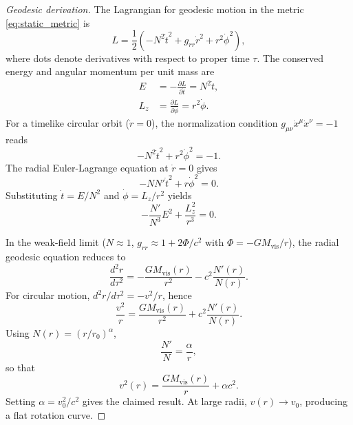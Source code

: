 \documentclass[11pt,a4paper]{article}
\theoremstyle{definition}
\newcommand{\vis}{\mathrm{vis}}
\begin{document}
\begin{proof}[Geodesic derivation]
The Lagrangian for geodesic motion in the metric \eqref{eq:static_metric} is
\begin{equation}
    L = \frac{1}{2}\left(-N^2\dot{t}^2 + g_{rr}\dot{r}^2 + r^2\dot{\phi}^2\right),
\end{equation}
where dots denote derivatives with respect to proper time $\tau$. The conserved energy and angular momentum per unit mass are
\begin{align}
    E &= -\frac{\partial L}{\partial \dot{t}} = N^2\dot{t}, \\
    L_z &= \frac{\partial L}{\partial \dot{\phi}} = r^2\dot{\phi}.
\end{align}
For a timelike circular orbit ($\dot{r}=0$), the normalization condition $g_{\mu\nu}\dot{x}^\mu\dot{x}^\nu=-1$ reads
\begin{equation}
    -N^2\dot{t}^2 + r^2\dot{\phi}^2 = -1.
\end{equation}
The radial Euler-Lagrange equation at $\dot{r}=0$ gives
\begin{equation}
    -NN'\dot{t}^2 + r\dot{\phi}^2 = 0.
\end{equation}
Substituting $\dot{t}=E/N^2$ and $\dot{\phi}=L_z/r^2$ yields
\begin{equation}
    -\frac{N'}{N^3}E^2 + \frac{L_z^2}{r^3} = 0.
\end{equation}

In the weak-field limit ($N\approx 1$, $g_{rr}\approx 1+2\Phi/c^2$ with $\Phi=-GM_{\vis}/r$), the radial geodesic equation reduces to
\begin{equation}
    \frac{d^2r}{d\tau^2} = -\frac{GM_{\vis}(r)}{r^2} - c^2\frac{N'(r)}{N(r)}.
\end{equation}
For circular motion, $d^2r/d\tau^2 = -v^2/r$, hence
\begin{equation}
    \frac{v^2}{r} = \frac{GM_{\vis}(r)}{r^2} + c^2\frac{N'(r)}{N(r)}.
\end{equation}
Using $N(r)=(r/r_0)^\alpha$,
\begin{equation}
    \frac{N'}{N} = \frac{\alpha}{r},
\end{equation}
so that
\begin{equation}
    v^2(r) = \frac{GM_{\vis}(r)}{r} + \alpha c^2.
\end{equation}
Setting $\alpha=v_0^2/c^2$ gives the claimed result. At large radii, $v(r)\to v_0$, producing a flat rotation curve.
\end{proof}
\end{document}
